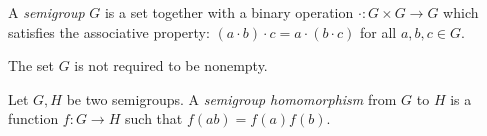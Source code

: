 \documentclass{article}
\begin{document}
A {\em semigroup} $G$ is a set together with a binary operation $\cdot: G \times G \longrightarrow G$ which satisfies the associative property: $(a \cdot b) \cdot c = a \cdot (b \cdot c)$ for all $a,b,c \in G$.

The set $G$ is not required to be nonempty.

Let $G,H$ be two semigroups.  A \emph{semigroup homomorphism} from $G$ to $H$ is a function $f:G\to H$ such that $f(ab)=f(a)f(b)$.
\end{document}
